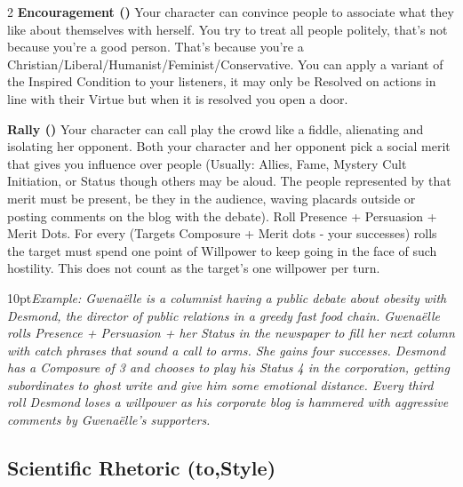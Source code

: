 \begin{multicols}{2}
\textbf{Encouragement (\textbullet\textbullet\textbullet\textbullet)} Your character can convince people to associate what they like about themselves with herself. You try to treat all people politely, that's not because you're a good person. That's because you're a Christian/Liberal/Humanist/Feminist/Conservative. You can apply a variant of the Inspired Condition to your listeners, it may only be Resolved on actions in line with their Virtue but when it is resolved you open a door.

\textbf{Rally (\textbullet\textbullet\textbullet\textbullet\textbullet)} Your character can call play the crowd like a fiddle, alienating and isolating her opponent. Both your character and her opponent pick a social merit that gives you influence over people (Usually: Allies, Fame, Mystery Cult Initiation, or Status though others may be aloud. The people represented by that merit must be present, be they in the audience, waving placards outside or posting comments on the blog with the debate). Roll Presence + Persuasion + Merit Dots. For every (Targets Composure + Merit dots - your successes) rolls the target must spend one point of Willpower to keep going in the face of such hostility. This does not count as the target's one willpower per turn.

\begin{myindentpar}{10pt}\textit{Example: Gwena\"{e}lle is a columnist having a public debate about obesity with Desmond, the director of public relations in a greedy fast food chain. Gwena\"{e}lle rolls Presence + Persuasion + her Status in the newspaper to fill her next column with catch phrases that sound a call to arms. She gains four successes. Desmond has a Composure of 3 and chooses to play his Status 4 in the corporation, getting subordinates to ghost write and give him some emotional distance. Every third roll Desmond loses a willpower as his corporate blog is hammered with aggressive comments by Gwena\"{e}lle's supporters. }\end{myindentpar}

\subsection*{Scientific Rhetoric (\textbullet\nobreak\hspace{.16667em}to\nobreak\hspace{.16667em}\textbullet\textbullet\textbullet\textbullet\textbullet,\nobreak\hspace{.16667em}Style)}


\end{multicols}
